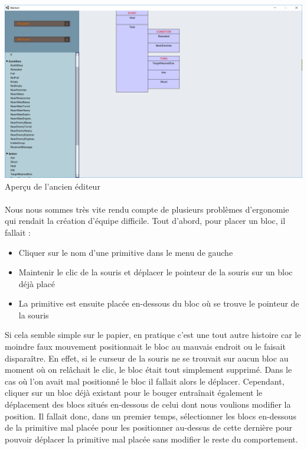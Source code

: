 \documentclass{report}
\begin{document}
\paragraph{}
\begin{adjustwidth}{-2.5em}{}
\includegraphics[scale=0.4]{DATA/oldEditor.png}
 {Aperçu de l'ancien éditeur}
\end{adjustwidth}
\paragraph{}
    Nous nous sommes très vite rendu compte de plusieurs problèmes d’ergonomie qui rendait la création d’équipe difficile.
Tout d’abord, pour placer un bloc, il fallait :
\begin{itemize}
\item Cliquer sur le nom d’une primitive dans le menu de gauche
\item Maintenir le clic de la souris et déplacer le pointeur de la souris sur un bloc déjà placé
\item La primitive est ensuite placée en-dessous du bloc où se trouve le pointeur de la souris
\end{itemize}
Si cela semble simple sur le papier, en pratique c’est une tout autre histoire car le moindre faux mouvement positionnait le bloc au mauvais endroit ou le faisait disparaître.
En effet, si le curseur de la souris ne se trouvait sur aucun bloc au moment où on relâchait le clic, le bloc était tout simplement supprimé. \newline
Dans le cas où l’on avait mal positionné le bloc il fallait alors le déplacer. Cependant, cliquer sur un bloc déjà existant pour le bouger entraînait également le déplacement des blocs situés en-dessous de celui dont nous voulions modifier la position. Il fallait donc, dans un premier temps, sélectionner les blocs en-dessous de la primitive mal placée pour les positionner au-dessus de cette dernière pour pouvoir déplacer la primitive mal placée sans modifier le reste du comportement.
\end{document}
